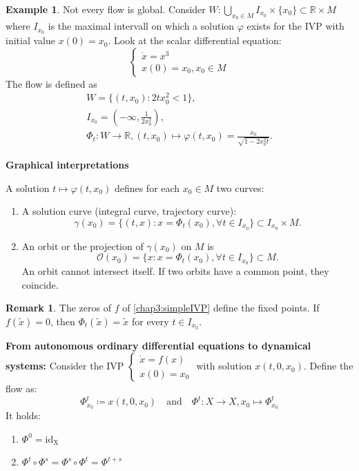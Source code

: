 \documentclass[hidelinks,a4paper, 11pt]{article}
\theoremstyle{plain}
\theoremstyle{break}
\theoremstyle{plain}
\theoremstyle{definition}
\newtheorem*{example}{Example}
\newtheorem*{remark}{Remark}
\begin{document}
\begin{example}
	Not every flow is global. Consider $W: \bigcup_{x_0 \in M} I_{x_0} \times \{ x_ 0 \} \subset \mathbb R \times M$ where $I_{x_0}$ is the maximal intervall on which a solution $\varphi$ exists for the IVP with initial value $x(0) = x_0$. Look at the scalar differential equation:
	\[
	\begin{cases}
	\dot x = x^3 \\ x(0) = x_0, x_0 \in M
	\end{cases}
	\]
	The flow is defined as 
	\begin{gather*}
	W = \{ (t,x_0) : 2tx_0^2 < 1 \}, \\
	I_{x_0} = (- \infty, \frac{1}{2x_0^2}) ,\\
	\Phi_t: W \to \mathbb R, (t,x_0) \mapsto \varphi(t,x_0) = \frac{x_0}{\sqrt{1-2x_0^2t}}.
	\end{gather*}
\end{example}


\textbf{Graphical interpretations}

A solution $t \mapsto \varphi(t,x_0)$ defines for each $x_0 \in M$ two curves:
\begin{enumerate}
	\item A solution curve (integral curve, trajectory curve): 
	\[
		\gamma(x_0) = \{ (t,x) : x=\Phi_t(x_0), \forall t \in I_{x_0} \} \subset I_{x_0} \times M.
	\]
	
	\item An orbit or the projection of $\gamma(x_0)$ on $M$ is
	\[
		\mathcal O(x_0) = \{ x: x = \Phi_t(x_0), \forall t \in I_{x_0} \} \subset M.
	\]
	An orbit cannot intersect itself. If two orbits have a common point, they coincide.
\end{enumerate}

\begin{remark}
The zeros of $f$ of \eqref{chap3:simpleIVP} define the fixed points. If $f(\tilde x ) = 0$, then $\Phi_t(\tilde x) = \tilde x$ for every $t \in I_{x_0}$.
\end{remark}


\textbf{From autonomous ordinary differential equations to dynamical systems:} Consider the IVP
$
	\begin{cases}
		\dot x = f(x) \\
		x(0) = x_0
	\end{cases}
$
with solution $x(t,0,x_0)$. Define the flow as:
\[
	\Phi^t_{x_0} \coloneqq x(t,0,x_0) \quad \text{and} \quad \Phi^t: X \to X, x_0 \mapsto \Phi^t_{x_0}
\]
It holds:
\begin{enumerate}[label=(\arabic*)]
	\item $\Phi^0 = \mathrm{id_X}$
	\item $\Phi^t \circ \Phi^s = \Phi^s \circ \Phi^t = \Phi^{t+s}$
\end{enumerate}
\end{document}
